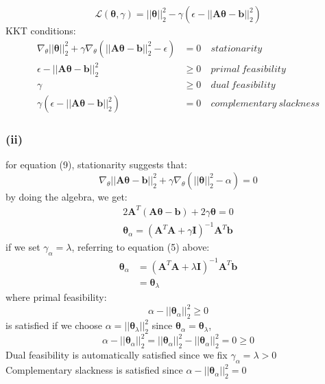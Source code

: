 \documentclass[11pt]{article}
\begin{document}
\begin{equation}
\mathcal{L}(\pmb{\theta},\gamma)=||\pmb{\theta}||^2_2-\gamma(\epsilon-||\pmb{A\theta}-\pmb{b}||^2_2)
\end{equation}
KKT conditions:\\
\begin{equation}
\begin{aligned}
\nabla_\theta||\pmb{\theta}||^2_2+\gamma\nabla_\theta(||\pmb{A\theta}-\pmb{b}||^2_2-\epsilon)&=0 &\ stationarity\\
\epsilon-||\pmb{A\theta}-\pmb{b}||^2_2&\ge 0 &\ primal\ feasibility\\
\gamma&\ge 0 &\ dual\ feasibility\\
\gamma(\epsilon-||\pmb{A\theta}-\pmb{b}||^2_2)&=0 &\ complementary\ slackness
\end{aligned}
\end{equation}

\subsubsection*{(ii)}
for equation (9), stationarity suggests that:
\begin{equation}
\nabla_\theta||\pmb{A\theta}-\pmb{b}||^2_2+\gamma\nabla_\theta(||\pmb{\theta}||^2_2-\alpha)=0
\end{equation}
by doing the algebra, we get:
\begin{equation}
\begin{split}
2\pmb{A}^T(\pmb{A\theta}-\pmb{b})+2\gamma\pmb{\theta}=0\\
\pmb{\theta}_\alpha=(\pmb{A}^T\pmb{A}+\gamma\pmb{I})^{-1}\pmb{A}^T\pmb{b}
\end{split}
\end{equation}
if we set $\gamma_\alpha=\lambda$, referring to equation (5) above:\\
\begin{equation}
\begin{split}
\pmb{\theta}_\alpha&=(\pmb{A}^T\pmb{A}+\lambda\pmb{I})^{-1}\pmb{A}^T\pmb{b}\\
&=\pmb{\theta}_\lambda
\end{split}
\end{equation}
where primal feasibility:
$$\alpha-||\pmb{\theta}_\alpha||^2_2\ge 0$$
is satisfied if we choose $\alpha = ||\pmb{\theta}_\lambda||^2_2$ since $\pmb{\theta}_\alpha = \pmb{\theta}_\lambda$,\\
	$$\alpha-||\pmb{\theta}_\alpha||^2_2=||\pmb{\theta}_\alpha||^2_2-||\pmb{\theta}_\alpha||^2_2=0\ge0$$
Dual feasibility is automatically satisfied since we fix $\gamma_\alpha=\lambda>0$\\
Complementary slackness is satisfied since 	$\alpha-||\pmb{\theta}_\alpha||^2_2=0$\\
\end{document}
